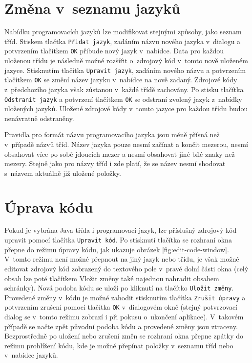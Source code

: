 \documentclass[czech,BP]{thesiskiv}
\begin{document}
\section{Změna v~seznamu jazyků}
Nabídku programovacích jazyků lze modifikovat stejnými způsoby, jako seznam tříd. Stiskem tlačtka \texttt{Přidat jazyk}, zadáním názvu nového jazyka v~dialogu a potvrzením tlačítkem \texttt{OK} přibude nový jazyk v~nabídce. Data pro každou uloženou třídu je následně možné rozšířit o~zdrojový kód v~tomto nově uloženém jazyce. Stisknutím tlačítka \texttt{Upravit jazyk}, zadáním nového názvu a potvrzením tlačítkem \texttt{OK} se změní název jazyku v~nabídce na nově zadaný. Zdrojové kódy z~předchozího jazyka však zůstanou v~každé třídě zachovány. Po stisku tlačítka \texttt{Odstranit jazyk} a potvrzení tlačítkem \texttt{OK} se odstraní zvolený jazyk z~nabídky uložených jazyků. Uložené zdrojové kódy v~tomto jazyce pro každou třídu budou nenávratně odstraněny.\par
Pravidla pro formát názvu programovacího jazyka jsou méně přísná než v~případě názvů tříd. Název jazyka pouze nesmí začínat a končit mezerou, nesmí obsahovat více po sobě jdoucích mezer a nesmí obsahovat jiné bílé znaky než mezery. Stejně jako pro názvy tříd i zde platí, že se název nesmí shodovat s~názvem aktuálně již uložené položky.

\section{Úprava kódu}
Pokud je vybrána Java třída i programovací jazyk, lze příslušný zdrojový kód upravit pomocí tlačítka \texttt{Upravit kód}. Po stisknutí tlačítka se rozhraní okna přepne do režimu úpravy kódu, jak ukazuje obrázek \ref{fig:edit-code-window}. V~tomto režimu není možné přepnout na jiný jazyk nebo třídu, je však možné editovat zdrojový kód zobrazený do textového pole v~pravé dolní části okna (celý obsah lze poté tlačítkem Vložit změny také najednou nahradit obsahem schránky). Nová podoba kódu se uloží po kliknutí na tlačítko \texttt{Uložit změny}. Provedené změny v~kódu je možné zahodit stisknutím tlačítka \texttt{Zrušit úpravy} a potvrzením zrušení pomocí tlačítka \texttt{OK} v~dialogovém okně (stejný potvrzovací dialog se v~tomto režimu zobrazí i při pokusu o~ukončení aplikace). V~takovém případě se načte zpět původní podoba kódu a provedené změny jsou ztraceny. Bezprostředně po uložení nebo zrušení změn se rozhraní okna přepne zpátky do režimu prohlížení kódu, kde je možné přepínat položky v~seznamu tříd nebo v~nabídce jazyků.
\end{document}
